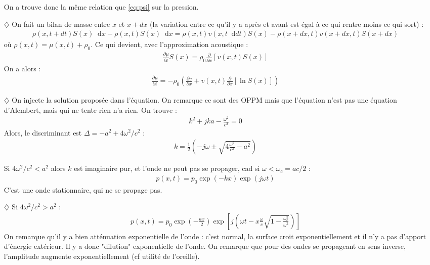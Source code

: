 \documentclass{report}
\newcommand*\dif{\mathop{}\!\mathrm{d}}
\begin{document}
\begin{itemize}
On a trouve donc  la même relation que \ref{eq:psi} sur la pression.

\item[$\diamondsuit$] On fait un bilan de masse entre $x$ et $x+dx$ (la variation entre ce qu'il y a après et avant est égal à ce qui rentre moins ce qui sort) :
	\begin{align*}
		\rho(x,t+dt)S(x)\dif x-\rho(x,t)S(x)\dif x=\rho(x,t)v(x,t\dif dt)S(x)-\rho(x+dx,t)v(x+dx,t)S(x+dx)
	\end{align*}
où $\rho(x,t)=\mu(x,t)+\rho_0$. Ce qui devient, avec l'approximation acoustique :
	\begin{align*}
		\frac{\partial \mu}{\partial t}S(x)=\rho_0\frac{\partial}{\partial x}\left[ v(x,t)S(x)\right] 
	\end{align*}
	On a alors : 
	\begin{align*}
		\frac{\partial \mu}{\partial t} = -\rho_0\left(\frac{\partial v}{\partial x}+v(x,t)\frac{\partial }		{\partial x}\left[\ln S(x) \right]  \right)
	\end{align*}

\item[$\diamondsuit$]  On injecte la solution proposée dans l'équation. On remarque ce sont des OPPM mais que l'équation n'est pas une équation d'Alembert, mais qui ne tente rien n'a rien. On trouve :
	\begin{align*}
		k^2+jka-\frac{\omega^2}{c^2}=0
	\end{align*}
	Alors, le discriminant est $\Delta=-a^2+4\omega^2/c^2$ :
	\begin{align*}
		k=\frac{1}{2}\left(-j\omega\pm\sqrt{4\frac{\omega^2}{c^2}-a^2}\right) 
	\end{align*}

	Si $4\omega^2/c^2<a^2$ alors $k$ est imaginaire pur, et l'onde ne peut pas se propager, cad si $\omega<\omega_c=ac/2$ :
	\begin{align*}
		p(x,t)=p_0\exp(-kx)\exp(j\omega t)
	\end{align*}
	C'est une onde stationnaire, qui ne se propage pas.
	
	\item[$\diamondsuit$] Si $4\omega^2/c^2>a^2$ :
	\begin{align*}
		p(x,t)=p_0\exp\left(-\frac{ax}{2} \right) \exp\left[ j\left(\omega t- x\frac{\omega}{c}\sqrt{1-\frac{\omega_c^2}{\omega^2}}\right) \right] 
	\end{align*}
	On remarque qu'il y a bien atténuation exponentielle de l'onde : c'est normal, la surface croit exponentiellement et il n'y a pas d'apport d'énergie extérieur. Il y a donc "dilution" exponentielle de l'onde. On remarque que pour des ondes se propageant en sens inverse, l'amplitude augmente exponentiellement (cf utilité de l'oreille).
	

\end{itemize}
\end{document}
